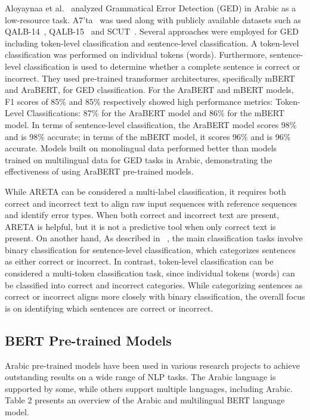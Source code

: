 Aloyaynaa et al.~\cite{aloyaynaa2023arabic} analyzed Grammatical Error Detection (GED) in Arabic as a low-resource task. A7'ta~\cite{madi2019a7} was used along with publicly available datasets such as  QALB-14~\cite{mohit2014first}, QALB-15~\cite{rozovskaya2015second} and SCUT~\cite{solyman2022automatic}. Several approaches were employed for GED including token-level classification and sentence-level classification. A token-level classification was performed on individual tokens (words). Furthermore, sentence-level classification is used to determine whether a complete sentence is correct or incorrect. They used pre-trained transformer architectures, specifically mBERT and AraBERT, for GED classification. For the AraBERT and mBERT models, F1 scores of 85\% and 85\% respectively showed high performance metrics: Token-Level Classifications: 87\% for the AraBERT model and 86\% for the mBERT model. In terms of sentence-level classification, the AraBERT model scores 98\% and is 98\% accurate; in terms of the mBERT model, it scores 96\% and is 96\% accurate. Models built on monolingual data performed better than models trained on multilingual data for GED tasks in Arabic, demonstrating the effectiveness of using AraBERT pre-trained models.


While ARETA can be considered a multi-label classification, it requires both correct and incorrect text to align raw input sequences with reference sequences and identify error types. When both correct and incorrect text are present, ARETA is helpful, but it is not a predictive tool when only correct text is present. On another hand, As described in ~\cite{aloyaynaa2023arabic}, the main classification tasks involve binary classification for sentence-level classification, which categorizes sentences as either correct or incorrect. In contrast, token-level classification can be considered a multi-token classification task, since individual tokens (words) can be classified into correct and incorrect categories. While categorizing sentences as correct or incorrect aligns more closely with binary classification, the overall focus is on identifying which sentences are correct or incorrect. 
 \subsection{BERT Pre-trained Models}
Arabic pre-trained models have been used in various research projects to achieve outstanding results on a wide range of NLP tasks. The Arabic language is supported by some, while others support multiple languages, including Arabic. Table 2 presents an overview of the Arabic and multilingual BERT language model.

